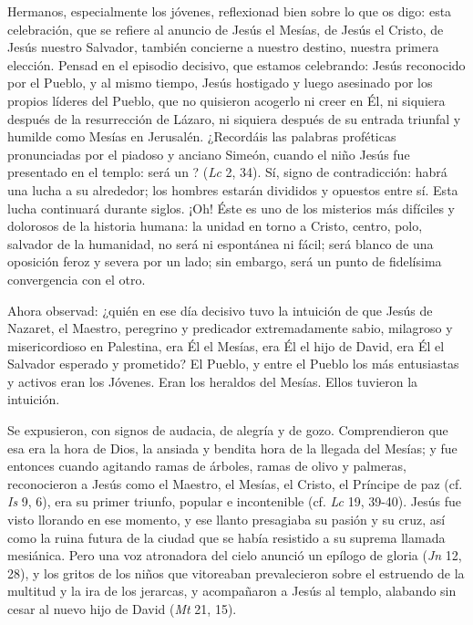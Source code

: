 \begin{body}
Hermanos, especialmente los jóvenes, reflexionad bien sobre lo que os digo: esta celebración, que se refiere al anuncio de Jesús el Mesías, de Jesús el Cristo, de Jesús nuestro Salvador, también concierne a nuestro destino, nuestra primera elección. Pensad en el episodio decisivo, que estamos celebrando: Jesús reconocido por el Pueblo, y al mismo tiempo, Jesús hostigado y luego asesinado por los propios líderes del Pueblo, que no quisieron acogerlo ni creer en Él, ni siquiera después de la resurrección de Lázaro, ni siquiera después de su entrada triunfal y humilde como Mesías en Jerusalén. ¿Recordáis las palabras proféticas pronunciadas por el piadoso y anciano Simeón, cuando el niño Jesús fue presentado en el templo: será un ? (\textit{Lc} 2, 34). Sí, signo de contradicción: habrá una lucha a su alrededor; los hombres estarán divididos y opuestos entre sí. Esta lucha continuará durante siglos. ¡Oh! Éste es uno de los misterios más difíciles y dolorosos de la historia humana: la unidad en torno a Cristo, centro, polo, salvador de la humanidad, no será ni espontánea ni fácil; será blanco de una oposición feroz y severa por un lado; sin embargo, será un punto de fidelísima convergencia con el otro.

Ahora observad: ¿quién en ese día decisivo tuvo la intuición de que Jesús de Nazaret, el Maestro, peregrino y predicador extremadamente sabio, milagroso y misericordioso en Palestina, era Él el Mesías, era Él el hijo de David, era Él el Salvador esperado y prometido? El Pueblo, y entre el Pueblo los más entusiastas y activos eran los Jóvenes. Eran los heraldos del Mesías. Ellos tuvieron la intuición.

Se expusieron, con signos de audacia, de alegría y de gozo. Comprendieron que esa era la hora de Dios, la ansiada y bendita hora de la llegada del Mesías; y fue entonces cuando agitando ramas de árboles, ramas de olivo y palmeras, reconocieron a Jesús como el Maestro, el Mesías, el Cristo, el Príncipe de paz (cf. \textit{Is} 9, 6), era su primer triunfo, popular e incontenible (cf. \textit{Lc} 19, 39-40). Jesús fue visto llorando en ese momento, y ese llanto presagiaba su pasión y su cruz, así como la ruina futura de la ciudad que se había resistido a su suprema llamada mesiánica. Pero una voz atronadora del cielo anunció un epílogo de gloria (\textit{Jn} 12, 28), y los gritos de los niños que vitoreaban prevalecieron sobre el estruendo de la multitud y la ira de los jerarcas, y acompañaron a Jesús al templo, alabando sin cesar al nuevo hijo de David (\textit{Mt} 21, 15).


\end{body}
